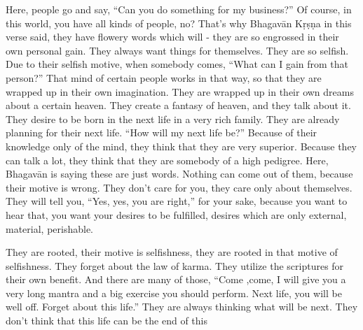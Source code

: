 Here, people go and say, “Can you do something for my business?” Of course, in this world, you have all kinds of people, no? That’s why Bhagavān Kṛṣṇa in this verse said, they have flowery words which will - they are so engrossed in their own personal gain. They always want things for themselves. They are so selfish. Due to their selfish motive, when somebody comes, “What can I gain from that person?” That mind of certain people works in that way, so that they are wrapped up in their own imagination. They are wrapped up in their own dreams about a certain heaven. They create a fantasy of heaven, and they talk about it. They desire to be born in the next life in a very rich family. They are already planning for their next life. “How will my next life be?” Because of their knowledge only of the mind, they think that they are very superior. Because they can talk a lot, they think that they are somebody of a high pedigree. Here, Bhagavān is saying these are just words. Nothing can come out of them, because their motive is wrong. They don’t care for you, they care only about themselves. They will tell you, “Yes, yes, you are right,” for your sake, because you want to hear that, you want your desires to be fulfilled, desires which are only external, material, perishable.

They are rooted, their motive is selfishness, they are rooted in that motive of selfishness. They forget about the law of karma. They utilize the scriptures for their own benefit. And there are many of those, “Come ,come, I will give you a very long mantra and a big exercise you should perform. Next life, you will be well off. Forget about this life.” They are always thinking what will be next. They don’t think that this life can be the end of this

